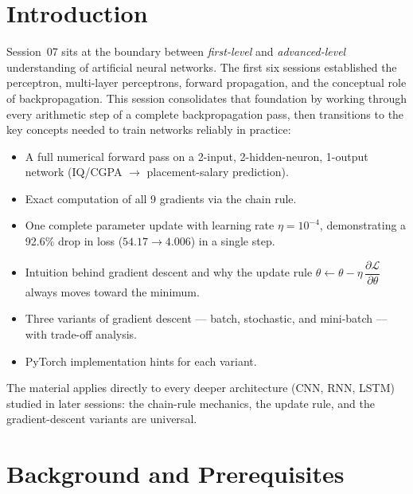 \documentclass[12pt,a4paper]{article}
\newcommand{\Loss}{\mathcal{L}}
\newcommand{\pderiv}[2]{\dfrac{\partial #1}{\partial #2}}
\begin{document}
\section{Introduction}
\label{sec:intro}

Session~07 sits at the boundary between \emph{first-level} and
\emph{advanced-level} understanding of artificial neural networks.
The first six sessions established the perceptron, multi-layer perceptrons,
forward propagation, and the conceptual role of backpropagation.
This session consolidates that foundation by working through every arithmetic
step of a complete backpropagation pass, then transitions to the key concepts
needed to train networks reliably in practice:

\begin{itemize}[leftmargin=2em]
  \item A full numerical forward pass on a 2-input, 2-hidden-neuron,
        1-output network (IQ/CGPA $\to$ placement-salary prediction).
  \item Exact computation of all 9 gradients via the chain rule.
  \item One complete parameter update with learning rate $\eta = 10^{-4}$,
        demonstrating a 92.6\% drop in loss ($54.17 \to 4.006$) in a single
        step.
  \item Intuition behind gradient descent and why the update rule
        $\theta \leftarrow \theta - \eta\,\pderiv{\Loss}{\theta}$ always
        moves toward the minimum.
  \item Three variants of gradient descent --- batch, stochastic, and
        mini-batch --- with trade-off analysis.
  \item PyTorch implementation hints for each variant.
\end{itemize}

The material applies directly to every deeper architecture (CNN, RNN, LSTM)
studied in later sessions: the chain-rule mechanics, the update rule, and the
gradient-descent variants are universal.

\section{Background and Prerequisites}
\label{sec:background}
\end{document}
